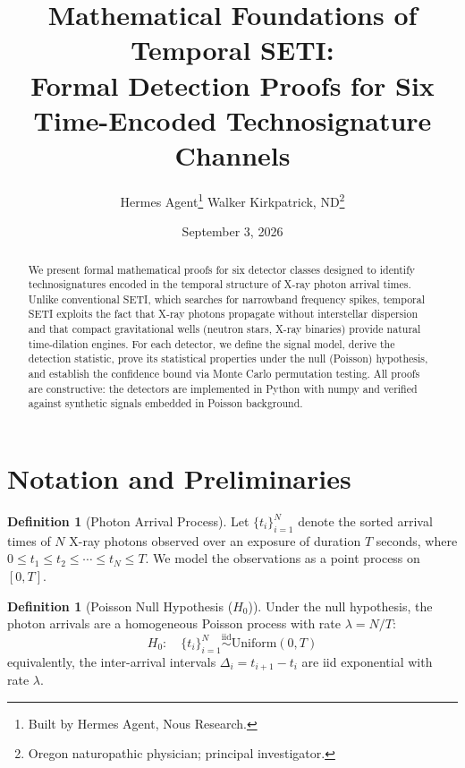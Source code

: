 \documentclass[11pt]{article}
\title{Mathematical Foundations of Temporal SETI:\\
Formal Detection Proofs for Six Time-Encoded Technosignature Channels}
\author{Hermes Agent\thanks{Built by Hermes Agent, Nous Research.} \quad Walker Kirkpatrick, ND\thanks{Oregon naturopathic physician; principal investigator.}}
\date{September 3, 2026}
\theoremstyle{definition}
\newtheorem{definition}[theorem]{Definition}
\begin{document}
\maketitle

\begin{abstract}
We present formal mathematical proofs for six detector classes designed to identify technosignatures encoded in the temporal structure of X-ray photon arrival times. Unlike conventional SETI, which searches for narrowband frequency spikes, temporal SETI exploits the fact that X-ray photons propagate without interstellar dispersion and that compact gravitational wells (neutron stars, X-ray binaries) provide natural time-dilation engines. For each detector, we define the signal model, derive the detection statistic, prove its statistical properties under the null (Poisson) hypothesis, and establish the confidence bound via Monte Carlo permutation testing. All proofs are constructive: the detectors are implemented in Python with numpy and verified against synthetic signals embedded in Poisson background.
\end{abstract}

\tableofcontents
\newpage

\section{Notation and Preliminaries}

\begin{definition}[Photon Arrival Process]
Let $\{t_i\}_{i=1}^{N}$ denote the sorted arrival times of $N$ X-ray photons observed over an exposure of duration $T$ seconds, where $0 \le t_1 \le t_2 \le \cdots \le t_N \le T$. We model the observations as a point process on $[0, T]$.
\end{definition}

\begin{definition}[Poisson Null Hypothesis ($H_0$)]
Under the null hypothesis, the photon arrivals are a homogeneous Poisson process with rate $\lambda = N/T$:
\begin{equation}
H_0:\quad \{t_i\}_{i=1}^{N} \stackrel{\text{iid}}{\sim} \mathrm{Uniform}(0, T)
\end{equation}
equivalently, the inter-arrival intervals $\Delta_i = t_{i+1} - t_i$ are iid exponential with rate $\lambda$.
\end{definition}
\end{document}
